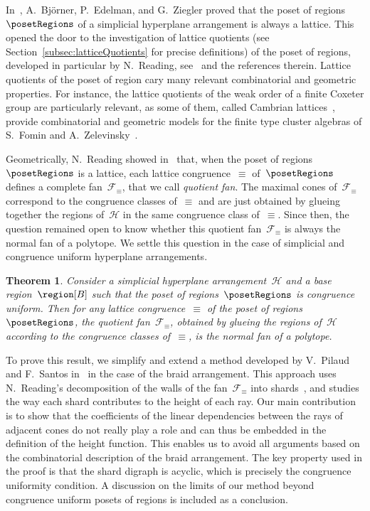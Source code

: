 \documentclass{amsart}
\newtheorem{theorem}{Theorem}%
\theoremstyle{definition}
\newcommand{\darkblue}{\color{darkblue}} %
\newcommand{\defn}[1]{\textsl{\darkblue #1}} %
\newcommand{\arrangement}{\mathcal{H}} %
\newcommand{\fanEquiv}{\mathcal{F}_\equiv} %
\begin{document}
In~\cite{BjornerEdelmanZiegler}, A.~Bj\"orner, P.~Edelman, and G.~Ziegler proved that the poset of regions~$\posetRegions$ of a simplicial hyperplane arrangement is always a lattice.
This opened the door to the investigation of lattice quotients (see Section~\ref{subsec:latticeQuotients} for precise definitions) of the poset of regions, developed in particular by N.~Reading, see~\cite{Reading-PosetRegionsChapter} and the references therein.
Lattice quotients of the poset of region cary many relevant combinatorial and geometric properties.
For instance, the lattice quotients of the weak order of a finite Coxeter group are particularly relevant, as some of them, called Cambrian lattices~\cite{Reading-CambrianLattices}, provide combinatorial and geometric models for the finite type cluster algebras of S.~Fomin and A.~Zelevinsky~\cite{FominZelevinsky-ClusterAlgebrasII}.

Geometrically, N.~Reading showed in~\cite{Reading-HopfAlgebras} that, when the poset of regions~$\posetRegions$ is a lattice, each lattice congruence~$\equiv$ of~$\posetRegions$ defines a complete fan~$\fanEquiv$, that we call \defn{quotient fan}.
The maximal cones of~$\fanEquiv$ correspond to the congruence classes of~$\equiv$ and are just obtained by glueing together the regions of~$\arrangement$ in the same congruence class of~$\equiv$.
Since then, the question remained open to know whether this quotient fan~$\fanEquiv$ is always the normal fan of a polytope.
We settle this question in the case of simplicial and congruence uniform hyperplane arrangements.

\begin{theorem}
\label{thm:quotientopes}
Consider a simplicial hyperplane arrangement~$\arrangement$ and a base region~$\region[B]$ such that the poset of regions~$\posetRegions$ is congruence uniform.
Then for any lattice congruence~$\equiv$ of the poset of regions~$\posetRegions$, the quotient fan~$\fanEquiv$, obtained by glueing the regions of~$\arrangement$ according to the congruence classes of~$\equiv$, is the normal fan of a polytope.
\end{theorem}

To prove this result, we simplify and extend a method developed by V.~Pilaud and F.~Santos in~\cite{PilaudSantos-quotientopes} in the case of the braid arrangement.
This approach uses N.~Reading's decomposition of the walls of the fan~$\fanEquiv$ into shards~\cite[Sect.~10.5]{Reading-FiniteCoxeterGroupsChapter}, and studies the way each shard contributes to the height of each ray.
Our main contribution is to show that the coefficients of the linear dependencies between the rays of adjacent cones do not really play a role and can thus be embedded in the definition of the height function.
This enables us to avoid all arguments based on the combinatorial description of the braid arrangement.
The key property used in the proof is that the shard digraph is acyclic, which is precisely the congruence uniformity condition.
A discussion on the limits of our method beyond congruence uniform posets of regions is included as a conclusion.
\end{document}

